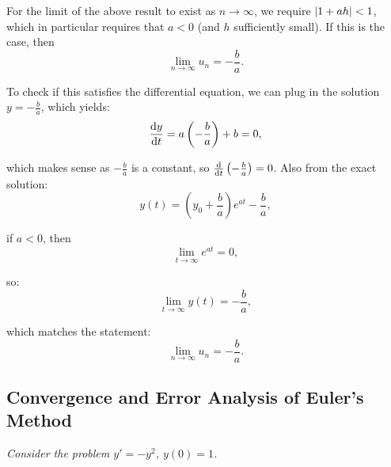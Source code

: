 For the limit of the above result to exist as $n\to\infty$, we require $\abs{1+ah} < 1$, which in particular requires that $a<0$ (and $h$ sufficiently small). If this is the case, then
\begin{equation*}
  \lim_{n\rightarrow\infty} u_{n} = -\frac{b}{a}.
\end{equation*}

To check if this satisfies the differential equation, we can plug in the solution $y = -\frac{b}{a}$, which yields:
\begin{equation*}
  \dv{y}{t} = a \left(-\frac{b}{a}\right) + b = 0,
\end{equation*}

which makes sense as $-\frac{b}{a}$ is a constant, so $\dv{t} \left(-\frac{b}{a}\right) = 0$. Also from the exact solution:
\begin{equation*}
    y(t) = \left(y_{0}+\frac{b}{a}\right)e^{at}-\frac{b}{a},
\end{equation*}

if $a<0$, then
\begin{equation*}
  \lim_{t\to\infty} e^{at} = 0,
\end{equation*}

so:
\begin{equation*}
  \lim_{t\to\infty} y(t) = -\frac{b}{a},
\end{equation*}

which matches the statement:
\begin{equation*}
    \lim_{n\to\infty} u_{n} = -\frac{b}{a}. 
\end{equation*}

\subsection{Convergence and Error Analysis of Euler's Method}
\textit{Consider the problem $y'=-y^{2}$, $y(0)=1$.}

